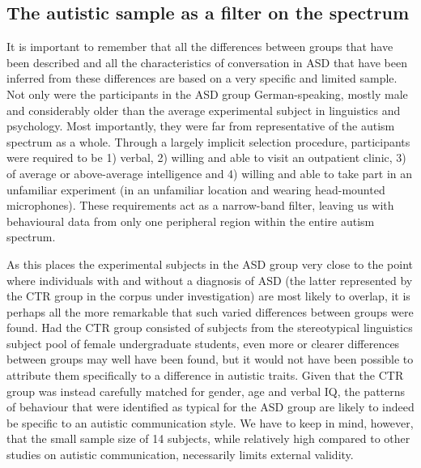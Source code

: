 \subsection{The autistic sample as a filter on the spectrum}\label{Conclusion_discussion_HFA}

It is important to remember that all the differences between groups that have been described and all the characteristics of conversation in ASD that have  been inferred from these differences are based on a very specific and limited sample. Not only were the participants in the ASD group German-speaking, mostly male and considerably older than the average experimental subject in linguistics and psychology. Most importantly, they were far from representative of the autism spectrum as a whole. Through a largely implicit selection procedure, participants were required to be 1) verbal, 2) willing and able to visit an outpatient clinic, 3) of average or above-average intelligence and 4) willing and able to take part in an unfamiliar experiment (in an unfamiliar location and wearing head-mounted microphones). These requirements act as a narrow-band filter, leaving us with behavioural data from only one peripheral region within the entire autism spectrum.

As this places the experimental subjects in the ASD group very close to the point where individuals with and without a diagnosis of ASD (the latter represented by the CTR group in the corpus under investigation) are most likely to overlap, it is perhaps all the more remarkable that such varied differences be\-tween groups were found. Had the CTR group consisted of subjects from the stereotypical linguistics subject pool of female undergraduate students, even more or clearer differences between groups may well have been found, but it would not have been possible to attribute them specifically to a difference in autistic traits. Given that the CTR group was instead carefully matched for gender, age and verbal IQ, the patterns of behaviour that were identified as typical for the ASD group are likely to indeed be specific to an autistic communication style. We have to keep in mind, however, that the small sample size of 14 subjects, while relatively high compared to other studies on autistic communication, necessarily limits external validity.

